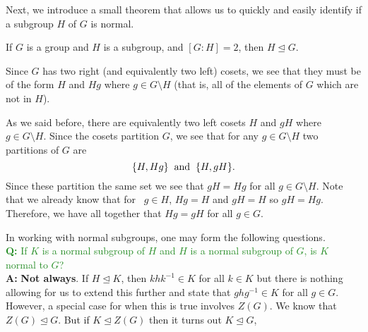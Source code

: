 \documentclass[12pt,letterpaper]{algebra_book}
\newcommand{\normal}{\unlhd}
\theoremstyle{definition}
\begin{document}
    Next, we introduce a small theorem that allows us to quickly and
    easily identify if a subgroup $H$ of $G$ is normal. 

    \begin{thm}
        If $G$ is a group and $H$ is a subgroup, and $[G:H] = 2$, then
        $H \normal G$.
    \end{thm}
    
    \begin{prf}
        Since $G$ has two right (and equivalently two left) cosets, we
        see that they must be of the form $H$ and $Hg$ where $g \in
        G\setminus H$ (that is, all of the elements of $G$ which are
        not in $H$).   

        As we said before, there are equivalently two left cosets $H$
        and $gH$ where $g \in G\setminus H$. Since the cosets partition $G$, we see that for any $g \in
        G\setminus H$ two partitions of $G$ are 
        \[
            \{H, Hg\} \hspace{0.2cm}\text{and}\hspace{0.2cm} \{H, gH\}.
        \]
        Since these partition the same set we see that $gH = Hg$ for
        all $g \in G\setminus H$. Note that we already know that for
        \    $g \in H$, $Hg = H$ and $gH = H$ so $gH = Hg$. Therefore,
        we have all together that $Hg = gH$ for all $g \in G$.
    \end{prf}

    \noindent In working with normal subgroups, one may form the following
    questions. 
    \\
    
    \textcolor{ForestGreen}{\textbf{Q:} If $K$ is a normal subgroup of $H$ and $H$ is a normal
    subgroup of $G$, is $K$ normal to $G$?}
    \\

    \textbf{A:} \textbf{Not always}. If $H \normal K$, then $khk^{-1} \in
    K$ for all $k \in K$ but there is nothing allowing for us to extend
    this further and state that $ghg^{-1} \in K$ for all $g \in G$. 
    \\
    However, a special case for when this is true involves $Z(G)$. We
    know that $Z(G) \normal G$. But if $K \normal Z(G)$ then
    it turns out $K \normal G$, 







    \newpage
\end{document}
